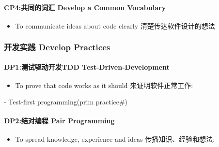 \hypertarget{cp4ux5171ux540cux7684ux8bcdux6c47-develop-a-common-vocabulary}{%
\paragraph{CP4:共同的词汇 Develop a Common
Vocabulary}\label{cp4ux5171ux540cux7684ux8bcdux6c47-develop-a-common-vocabulary}}

\begin{itemize}
\tightlist
\item
  To communicate ideas about code clearly 清楚传达软件设计的想法
\end{itemize}

\hypertarget{ux5f00ux53d1ux5b9eux8df5-develop-practices}{%
\subsubsection{开发实践 Develop
Practices}\label{ux5f00ux53d1ux5b9eux8df5-develop-practices}}

\hypertarget{dp1ux6d4bux8bd5ux9a71ux52a8ux5f00ux53d1tdd-test-driven-development}{%
\paragraph{DP1:测试驱动开发TDD
Test-Driven-Development}\label{dp1ux6d4bux8bd5ux9a71ux52a8ux5f00ux53d1tdd-test-driven-development}}

\begin{itemize}
\tightlist
\item
  To prove that code works as it should 来证明软件正常工作:\\
\end{itemize}

\begin{description}
\tightlist
\item[]
- Test-first programming(prim practice\#)
\end{description}

\hypertarget{dp2ux7ed3ux5bf9ux7f16ux7a0b-pair-programming}{%
\paragraph{DP2:结对编程 Pair
Programming}\label{dp2ux7ed3ux5bf9ux7f16ux7a0b-pair-programming}}

\begin{itemize}
\tightlist
\item
  To spread knowledge, experience and ideas 传播知识、经验和想法:\\
\end{itemize}

